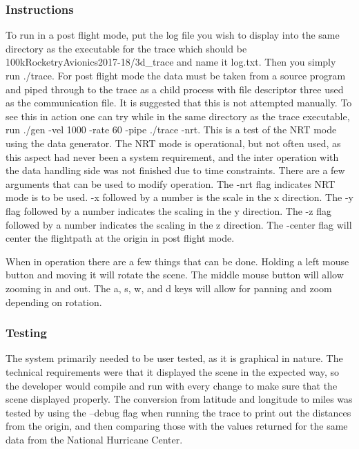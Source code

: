 \documentclass[onecolumn, draftclsnofoot,10pt, compsoc]{IEEEtran}
\begin{document}
\subsubsection{Instructions}
To run in a post flight mode, put the log file you wish to display into the same directory as the executable for the trace which should be 100kRocketryAvionics2017-18/3d\_trace and name it log.txt. Then you simply run ./trace. For post flight mode the data must be taken from a source program and piped through to the trace as a child process with file descriptor three used as the communication file. It is suggested that this is not attempted manually. To see this in action one can try while in the same directory as the trace executable, run ./gen -vel 1000 -rate 60 -pipe ./trace -nrt. This is a test of the NRT mode using the data generator. The NRT mode is operational, but not often used, as this aspect had never been a system requirement, and the inter operation with the data handling side was not finished due to time constraints.
There are a few arguments that can be used to modify operation. The -nrt flag indicates NRT mode is to be used. -x followed by a number is the scale in the x direction. The -y flag followed by a number indicates the scaling in the y direction. The -z flag followed by a number indicates the scaling in the z direction. The -center flag will center the flightpath at the origin in post flight mode. \par
When in operation there are a few things that can be done. Holding a left mouse button and moving it will rotate the scene. The middle mouse button will allow zooming in and out. The a, s, w, and d keys will allow for panning and zoom depending on rotation.
\subsubsection{Testing}
The system primarily needed to be user tested, as it is graphical in nature. The technical requirements were that it displayed the scene in the expected way, so the developer would compile and run with every change to make sure that the scene displayed properly. The conversion from latitude and longitude to miles was tested by using the –debug flag when running the trace to print out the distances from the origin, and then comparing those with the values returned for the same data from the National Hurricane Center.
\end{document}
